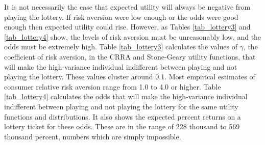 \documentclass[letterpaper,12pt]{article}
\numberwithin{equation}{section}
\numberwithin{figure}{section}
\numberwithin{table}{section}
\begin{document}
\begin{spacing}{1.5}
	It is not necessarily the case that expected utility will always be negative from playing the lottery.  If risk aversion were low enough or the odds were good enough then expected utility could rise.  However, as Tables \ref{tab_lottery3} and \ref{tab_lottery4} show, the levels of risk aversion must be unreasonably low, and the odds must be extremely high.  Table \ref{tab_lottery3} calculates the values of $\gamma$, the coefficient of risk aversion, in the CRRA and Stone-Geary utility functions, that will make the high-variance individual indifferent between playing and not playing the lottery.  These values cluster around 0.1.  Most empirical estimates of consumer relative risk aversion range from 1.0 to 4.0 or higher.  Table \ref{tab_lottery4} calculates the odds that will make the high-variance individual indifferent between playing and not playing the lottery for the same utility functions and distributions.  It also shows the expected percent returns on a lottery ticket for these odds.  These are in the range of 228 thousand to 569 thousand percent, numbers which are simply impossible.



\end{spacing}
\end{document}

